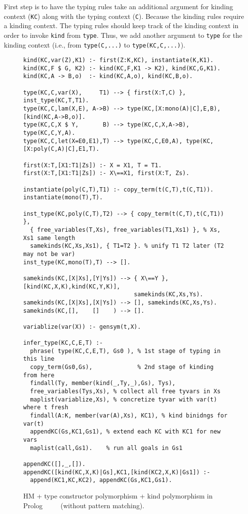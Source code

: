 \documentclass[runningheads,a4paper]{llncs}
\begin{document}
First step is to have the typing rules take an additional argument for
kinding context (\verb|KC|) along with the typing context (\verb|C|).
Because the kinding rules require a kinding context. The typing rules
should keep track of the kinding context in order to invoke \verb|kind|
from \verb|type|. Thus, we add another argument to \verb|type| for
the kinding context (i.e., from \verb|type(C,...)| to \verb|type(KC,C,...)|).

\begin{figure} %
\begin{verbatim}
kind(KC,var(Z),K1) :- first(Z:K,KC), instantiate(K,K1).
kind(KC,F $ G, K2) :- kind(KC,F,K1 -> K2), kind(KC,G,K1).
kind(KC,A -> B,o)  :- kind(KC,A,o), kind(KC,B,o).

type(KC,C,var(X),     T1) --> { first(X:T,C) }, inst_type(KC,T,T1).
type(KC,C,lam(X,E), A->B) --> type(KC,[X:mono(A)|C],E,B), [kind(KC,A->B,o)].
type(KC,C,X $ Y,       B) --> type(KC,C,X,A->B), type(KC,C,Y,A).
type(KC,C,let(X=E0,E1),T) --> type(KC,C,E0,A), type(KC,[X:poly(C,A)|C],E1,T).

first(X:T,[X1:T1|Zs]) :- X = X1, T = T1.
first(X:T,[X1:T1|Zs]) :- X\==X1, first(X:T, Zs).

instantiate(poly(C,T),T1) :- copy_term(t(C,T),t(C,T1)).
instantiate(mono(T),T).

inst_type(KC,poly(C,T),T2) --> { copy_term(t(C,T),t(C,T1)) }, 
  { free_variables(T,Xs), free_variables(T1,Xs1) }, % Xs, Xs1 same length
  samekinds(KC,Xs,Xs1), { T1=T2 }. % unify T1 T2 later (T2 may not be var)
inst_type(KC,mono(T),T) --> [].

samekinds(KC,[X|Xs],[Y|Ys]) --> { X\==Y }, [kind(KC,X,K),kind(KC,Y,K)],
                                samekinds(KC,Xs,Ys).
samekinds(KC,[X|Xs],[X|Ys]) --> [], samekinds(KC,Xs,Ys).
samekinds(KC,[],    []    ) --> [].

variablize(var(X)) :- gensym(t,X).

infer_type(KC,C,E,T) :-
  phrase( type(KC,C,E,T), Gs0 ), % 1st stage of typing in this line
  copy_term(Gs0,Gs),             % 2nd stage of kinding from here
  findall(Ty, member(kind(_,Ty,_),Gs), Tys),
  free_variables(Tys,Xs), % collect all free tyvars in Xs
  maplist(variablize,Xs), % concretize tyvar with var(t) where t fresh
  findall(A:K, member(var(A),Xs), KC1), % kind binidngs for var(t)
  appendKC(Gs,KC1,Gs1), % extend each KC with KC1 for new vars
  maplist(call,Gs1).    % run all goals in Gs1

appendKC([],_,[]).
appendKC([kind(KC,X,K)|Gs],KC1,[kind(KC2,X,K)|Gs1]) :-
  append(KC1,KC,KC2), appendKC(Gs,KC1,Gs1).
\end{verbatim}
\caption{HM + type constructor polymorphism + kind polymorphism in Prolog
        $\qquad$
        (without pattern matching).}
\label{fig:HMtck}
\end{figure}
\end{document}
